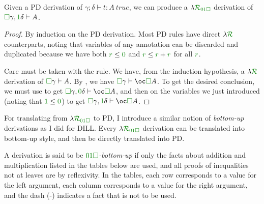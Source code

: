 \begin{proposition}[PD $\to$ \name]
  Given a PD derivation of $\gamma; \delta \vdash t : A~\mathit{true}$, we can
  produce a $\name_{\instPD}$ derivation of
  $\valid\gamma, \true\delta \vdash A$.
\end{proposition}
\begin{proof}
  By induction on the PD derivation.
  Most PD rules have direct $\name$ counterparts, noting that variables of any
  annotation can be discarded and duplicated because we have both
  $\gr r \leq \gr 0$ and
  $\gr r \leq \gr r + \gr r$ for all
  $\gr r$.

  Care must be taken with the  rule.
  We have, from the induction hypothesis, a $\name$ derivation of
  $\gr\Box\gamma \vdash A$.
  By , we have
  $\gr\Box\gamma \vdash \oc\valid A$.
  To get the desired conclusion, we must use  to get
  $\gr\Box\gamma, \gr\unused\delta \vdash \oc\valid A$, and
  then  on the variables we just introduced (noting that
  $\true \leq \unused$) to get
  $\gr\Box\gamma, \gr\true\delta \vdash \oc\valid A$.
\end{proof}

For translating from $\name_{\instPD}$ to PD, I introduce a similar notion of
\emph{bottom-up} derivations as I did for DILL\@.
Every $\name_{\instPD}$ derivation can be translated into bottom-up style, and
then be directly translated into PD\@.

\begin{definition}\label{def:PD-bottom-up}
  A derivation is said to be \emph{$\instPD$-bottom-up} if only the facts
  about addition and multiplication listed in the tables below are used,
  and all proofs of
  inequalities not at leaves are by reflexivity.
  In the tables, each row corresponds to a value for the left argument, each
  column corresponds to a value for the right argument, and the dash (-)
  indicates a fact that is not to be used.

\end{definition}

